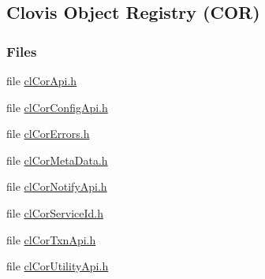 \hypertarget{group__group13}{
\subsection{Clovis Object Registry (COR)}
\label{group__group13}
}
\subsubsection*{Files}
\begin{CompactItemize}
\item 
file \hyperlink{cl_cor_api_8h}{cl\-Cor\-Api.h}
\item 
file \hyperlink{cl_cor_config_api_8h}{cl\-Cor\-Config\-Api.h}
\item 
file \hyperlink{cl_cor_errors_8h}{cl\-Cor\-Errors.h}
\item 
file \hyperlink{cl_cor_meta_data_8h}{cl\-Cor\-Meta\-Data.h}
\item 
file \hyperlink{cl_cor_notify_api_8h}{cl\-Cor\-Notify\-Api.h}
\item 
file \hyperlink{cl_cor_service_id_8h}{cl\-Cor\-Service\-Id.h}
\item 
file \hyperlink{cl_cor_txn_api_8h}{cl\-Cor\-Txn\-Api.h}
\item 
file \hyperlink{cl_cor_utility_api_8h}{cl\-Cor\-Utility\-Api.h}
\end{CompactItemize}
